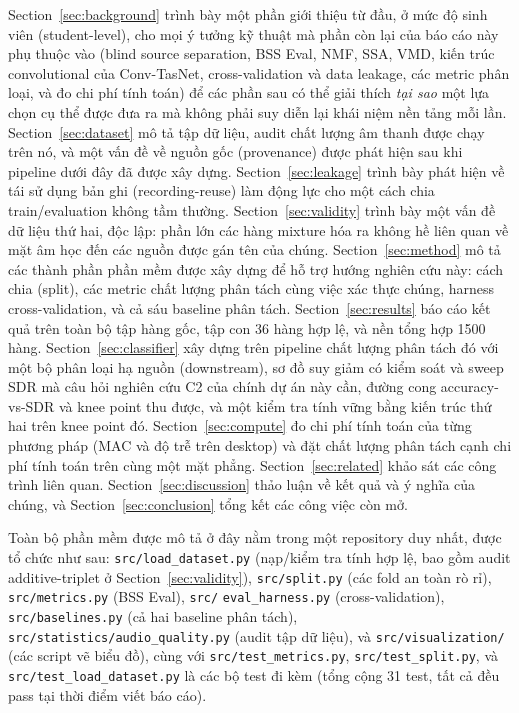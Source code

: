 \documentclass[11pt]{article}
\begin{document}
Section~\ref{sec:background} trình bày một phần giới thiệu từ đầu, ở mức
độ sinh viên (student-level), cho mọi ý tưởng kỹ thuật mà phần còn lại của
báo cáo này phụ thuộc vào (blind source separation, BSS Eval, NMF, SSA,
VMD, kiến trúc convolutional của Conv-TasNet, cross-validation và data
leakage, các metric phân loại, và đo chi phí tính toán) để các phần sau có
thể giải thích \emph{tại sao} một lựa chọn cụ thể được đưa ra mà không
phải suy diễn lại khái niệm nền tảng mỗi lần. Section~\ref{sec:dataset} mô
tả tập dữ liệu, audit chất lượng âm thanh được chạy trên nó, và một vấn đề
về nguồn gốc (provenance) được phát hiện sau khi pipeline dưới đây đã được
xây dựng. Section~\ref{sec:leakage} trình bày phát hiện về tái sử dụng bản
ghi (recording-reuse) làm động lực cho một cách chia train/evaluation
không tầm thường. Section~\ref{sec:validity} trình bày một vấn đề dữ liệu
thứ hai, độc lập: phần lớn các hàng mixture hóa ra không hề liên quan về
mặt âm học đến các nguồn được gán tên của chúng.
Section~\ref{sec:method} mô tả các thành phần phần mềm được xây dựng để
hỗ trợ hướng nghiên cứu này: cách chia (split), các metric chất lượng phân
tách cùng việc xác thực chúng, harness cross-validation, và cả sáu
baseline phân tách. Section~\ref{sec:results} báo cáo kết quả trên toàn
bộ tập hàng gốc, tập con 36 hàng hợp lệ, và nền tổng hợp 1500 hàng.
Section~\ref{sec:classifier} xây dựng trên pipeline chất lượng phân tách
đó với một bộ phân loại hạ nguồn (downstream), sơ đồ suy giảm có kiểm soát
và sweep SDR mà câu hỏi nghiên cứu C2 của chính dự án này cần, đường cong
accuracy-vs-SDR và knee point thu được, và một kiểm tra tính vững bằng
kiến trúc thứ hai trên knee point đó. Section~\ref{sec:compute} đo chi phí
tính toán của từng phương pháp (MAC và độ trễ trên desktop) và đặt chất
lượng phân tách cạnh chi phí tính toán trên cùng một mặt phẳng.
Section~\ref{sec:related} khảo sát các công trình liên quan.
Section~\ref{sec:discussion} thảo luận về kết quả và ý nghĩa của chúng, và
Section~\ref{sec:conclusion} tổng kết các công việc còn mở.

Toàn bộ phần mềm được mô tả ở đây nằm trong một repository duy nhất, được
tổ chức như sau: \texttt{src/load\_dataset.py} (nạp/kiểm tra tính hợp lệ,
bao gồm audit additive-triplet ở Section~\ref{sec:validity}),
\texttt{src/split.py} (các fold an toàn rò rỉ), \texttt{src/metrics.py}
(BSS Eval), \texttt{src/}
\texttt{eval\_harness.py} (cross-validation), \texttt{src/baselines.py}
(cả hai baseline phân tách), \texttt{src/statistics/audio\_quality.py}
(audit tập dữ liệu), và \texttt{src/visualization/} (các script vẽ biểu
đồ), cùng với \texttt{src/test\_metrics.py}, \texttt{src/test\_split.py},
và \texttt{src/test\_load\_dataset.py} là các bộ test đi kèm (tổng cộng 31
test, tất cả đều pass tại thời điểm viết báo cáo).
\end{document}
